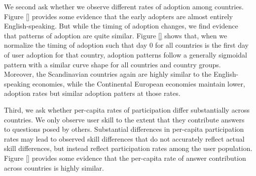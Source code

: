 \documentclass[11pt]{article}
\begin{document}
We second ask whether we observe different rates of adoption among
countries. Figure \ref{} provides some evidence that the early
adopters are almost entirely English-speaking. But while the timing of
adoption changes, we find evidence that patterns of adoption are quite
similar. Figure \ref{} shows that, when we normalize the timing of
adoption such that day 0 for all countries is the first day of user
adoption for that country, adoption patterns follow a generally
sigmoidal pattern with a similar curve shape for all countries and
country groups. Moreover, the Scandinavian countries again are highly
similar to the English-speaking economies, while the Continental
European economies maintain lower, adoption rates but similar adoption
patters at those rates.

Third, we ask whether per-capita rates of participation differ
substantially across countries. We only observe user skill to the
extent that they contribute answers to questions posed by
others. Substantial differences in per-capita participation rates
may lead to observed skill differences that do not accurately reflect
actual skill differences, but instead reflect participation rates
among the user population. Figure \ref{} provides some evidence that
the per-capita rate of answer contribution across countries is highly
similar. 




\end{document}
